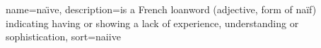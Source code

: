 


{
  name=na\"{\i}ve,
  description={is a French loanword (adjective, form of naïf)
               indicating having or showing a lack of experience,
               understanding or sophistication},
  sort=naiive
}

